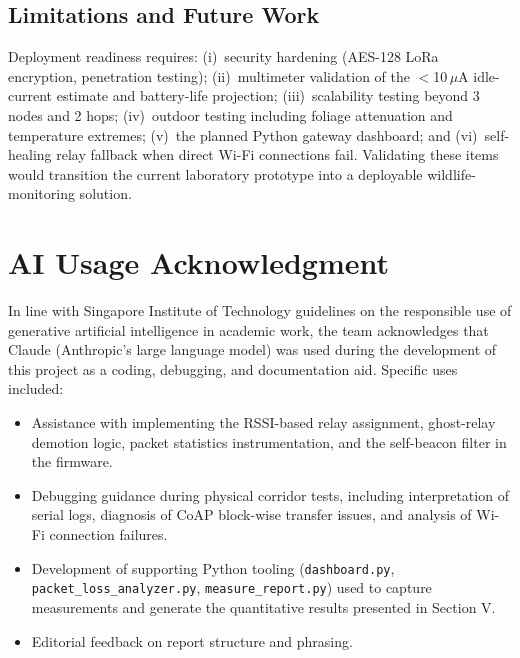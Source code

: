 \documentclass[12pt,a4paper]{article}
\begin{document}
\subsection{Limitations and Future Work}

Deployment readiness requires: (i)~security hardening (AES-128 LoRa encryption, penetration testing); (ii)~multimeter validation of the $<$10\,$\mu$A idle-current estimate and battery-life projection; (iii)~scalability testing beyond 3 nodes and 2 hops; (iv)~outdoor testing including foliage attenuation and temperature extremes; (v)~the planned Python gateway dashboard; and (vi)~self-healing relay fallback when direct Wi-Fi connections fail. Validating these items would transition the current laboratory prototype into a deployable wildlife-monitoring solution.

\newpage


\section*{AI Usage Acknowledgment}

In line with Singapore Institute of Technology guidelines on the responsible
use of generative artificial intelligence in academic work, the team
acknowledges that Claude (Anthropic's large language model) was used during
the development of this project as a coding, debugging, and documentation
aid. Specific uses included:

\begin{itemize}[leftmargin=1.5em, itemsep=0.2em]
    \item Assistance with implementing the RSSI-based relay assignment,
          ghost-relay demotion logic, packet statistics instrumentation,
          and the self-beacon filter in the firmware.
    \item Debugging guidance during physical corridor tests, including
          interpretation of serial logs, diagnosis of CoAP block-wise
          transfer issues, and analysis of Wi-Fi connection failures.
    \item Development of supporting Python tooling (\texttt{dashboard.py},
          \texttt{packet\_loss\_analyzer.py}, \texttt{measure\_report.py})
          used to capture measurements and generate the quantitative
          results presented in Section V.
    \item Editorial feedback on report structure and phrasing.
\end{itemize}
\end{document}
